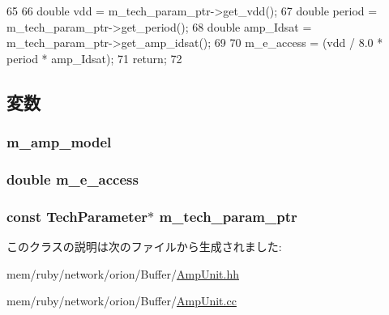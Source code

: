 \begin{DoxyCode}
65 {
66     double vdd = m_tech_param_ptr->get_vdd();
67     double period = m_tech_param_ptr->get_period();
68     double amp_Idsat = m_tech_param_ptr->get_amp_idsat();
69 
70     m_e_access = (vdd / 8.0 * period * amp_Idsat);
71     return;
72 }
\end{DoxyCode}


\subsection{変数}
\hypertarget{classAmpUnit_a9fdd47f0eac1fb8b364a356153c995ba}{
\subsubsection[{m\_\-amp\_\-model}]{ {\bf m\_\-amp\_\-model}}}
\label{classAmpUnit_a9fdd47f0eac1fb8b364a356153c995ba}
\hypertarget{classAmpUnit_aacef533a11a0322d1c0a20cd7e9b49ea}{
\subsubsection[{m\_\-e\_\-access}]{\setlength{\rightskip}{0pt plus 5cm}double {\bf m\_\-e\_\-access}}}
\label{classAmpUnit_aacef533a11a0322d1c0a20cd7e9b49ea}
\hypertarget{classAmpUnit_a11d1644aa2bfe0e16783dface6fadf13}{
\subsubsection[{m\_\-tech\_\-param\_\-ptr}]{\setlength{\rightskip}{0pt plus 5cm}const {\bf TechParameter}$\ast$ {\bf m\_\-tech\_\-param\_\-ptr}}}
\label{classAmpUnit_a11d1644aa2bfe0e16783dface6fadf13}


このクラスの説明は次のファイルから生成されました:\begin{DoxyCompactItemize}
\item 
mem/ruby/network/orion/Buffer/\hyperlink{AmpUnit_8hh}{AmpUnit.hh}\item 
mem/ruby/network/orion/Buffer/\hyperlink{AmpUnit_8cc}{AmpUnit.cc}\end{DoxyCompactItemize}
